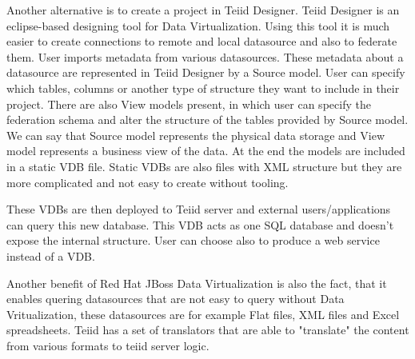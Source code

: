 \documentclass[12pt,oneside]{fithesis2}
\begin{document}
\par Another alternative is to create a project in Teiid Designer. Teiid Designer is an eclipse-based designing tool for Data Virtualization. Using this tool it is much easier to create connections to remote and local datasource and also to federate them. User imports metadata from various datasources. These metadata about a datasource are represented in Teiid Designer by a Source model. User can specify which tables, columns or another type of structure they want to include in their project. There are also View models present, in which user can specify the federation schema and alter the structure of the tables provided by Source model. We can say that Source model represents the physical data storage and View model represents a business view of the data. At the end the models are included in a static VDB file. Static VDBs are also files with XML structure but they are more complicated and not easy to create without tooling. 
\par These VDBs are then deployed to Teiid server and external users/applications can query this new database. This VDB acts as one SQL database and doesn't expose the internal structure. User can choose also to produce a web service instead of a VDB. 
\par Another benefit of Red Hat JBoss Data Virtualization is also the fact, that it enables quering datasources that are not easy to query without Data Vritualization, these datasources are for example Flat files, XML files and Excel spreadsheets. Teiid has a set of translators that are able to "translate" the content from various formats to teiid server logic.
\end{document}
